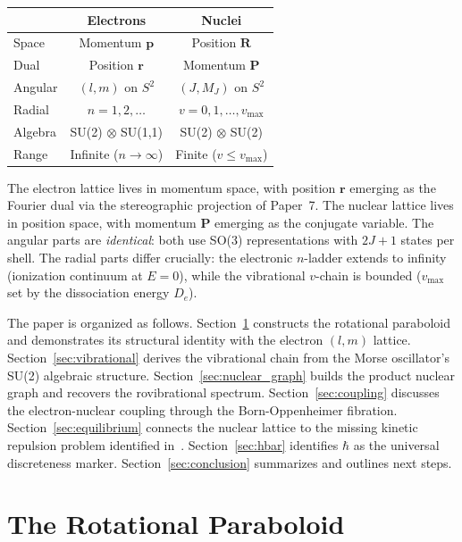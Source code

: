 \documentclass[aps,pra,twocolumn,superscriptaddress,longbibliography]{revtex4-2}
\begin{document}
\begin{center}
\begin{tabular}{lcc}
\toprule
& \textbf{Electrons} & \textbf{Nuclei} \\
\midrule
Space & Momentum $\mathbf{p}$ & Position $\mathbf{R}$ \\
Dual & Position $\mathbf{r}$ & Momentum $\mathbf{P}$ \\
Angular & $(l, m)$ on $S^2$ & $(J, M_J)$ on $S^2$ \\
Radial & $n = 1, 2, \ldots$ & $v = 0, 1, \ldots, v_{\max}$ \\
Algebra & SU(2) $\otimes$ SU(1,1) & SU(2) $\otimes$ SU(2) \\
Range & Infinite ($n \to \infty$) & Finite ($v \leq v_{\max}$) \\
\bottomrule
\end{tabular}
\end{center}

The electron lattice lives in momentum space, with position $\mathbf{r}$
emerging as the Fourier dual via the stereographic projection of
Paper~7.  The nuclear lattice lives in position space, with momentum
$\mathbf{P}$ emerging as the conjugate variable.  The angular parts are
\emph{identical}: both use SO(3) representations with $2J+1$ states per
shell.  The radial parts differ crucially: the electronic $n$-ladder
extends to infinity (ionization continuum at $E = 0$), while the
vibrational $v$-chain is bounded ($v_{\max}$ set by the dissociation
energy $D_e$).

The paper is organized as follows.
Section~\ref{sec:rotational} constructs the rotational paraboloid and
demonstrates its structural identity with the electron $(l, m)$ lattice.
Section~\ref{sec:vibrational} derives the vibrational chain from the
Morse oscillator's SU(2) algebraic structure.
Section~\ref{sec:nuclear_graph} builds the product nuclear graph and
recovers the rovibrational spectrum.
Section~\ref{sec:coupling} discusses the electron-nuclear coupling
through the Born-Oppenheimer fibration.
Section~\ref{sec:equilibrium} connects the nuclear lattice to the
missing kinetic repulsion problem identified in~\cite{lcao_paper}.
Section~\ref{sec:hbar} identifies $\hbar$ as the universal discreteness
marker.
Section~\ref{sec:conclusion} summarizes and outlines next steps.


\section{The Rotational Paraboloid}
\label{sec:rotational}
\end{document}
